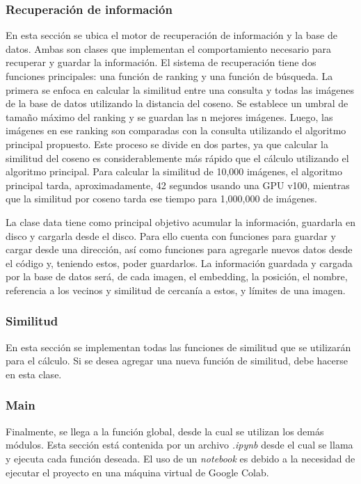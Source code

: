 \subsubsection{Recuperaci\'on de informaci\'on}
En esta sección se ubica el motor de recuperación de información y la base de datos. Ambas son clases que implementan el comportamiento necesario para recuperar y guardar la información. El sistema de recuperación tiene dos funciones principales: una función de ranking y una función de búsqueda. La primera se enfoca en calcular la similitud entre una consulta y todas las im\'agenes de la base de datos utilizando la distancia del coseno. Se establece un umbral de tamaño m\'aximo del ranking y se guardan las n mejores im\'agenes. Luego, las im\'agenes en ese ranking son comparadas con la consulta utilizando el algoritmo principal propuesto. Este proceso se divide en dos partes, ya que calcular la similitud del coseno es considerablemente m\'as r\'apido que el c\'alculo utilizando el algoritmo principal. Para calcular la similitud de 10,000 im\'agenes, el algoritmo principal tarda, aproximadamente, 42 segundos usando una GPU v100, mientras que la similitud por coseno tarda ese tiempo para 1,000,000 de im\'agenes.

La clase data tiene como principal objetivo acumular la información, guardarla en disco y cargarla desde el disco. Para ello cuenta con funciones para guardar y cargar desde una dirección, así como funciones para agregarle nuevos datos desde el código y, teniendo estos, poder guardarlos. La información guardada y cargada por la base de datos ser\'a, de cada imagen, el embedding, la posición, el nombre, referencia a los vecinos y similitud de cercanía a estos, y límites de una imagen.

\subsubsection{Similitud}
En esta sección se implementan todas las funciones de similitud que se utilizar\'an para el c\'alculo. Si se desea agregar una nueva función de similitud, debe hacerse en esta clase.

\subsubsection{Main} 
Finalmente, se llega a la función global, desde la cual se utilizan los dem\'as módulos. Esta sección est\'a contenida por un archivo \textit{.ipynb} desde el cual se llama y ejecuta cada función deseada. El uso de un \textit{notebook} es debido a la necesidad de ejecutar el proyecto en una m\'aquina virtual de Google Colab.


